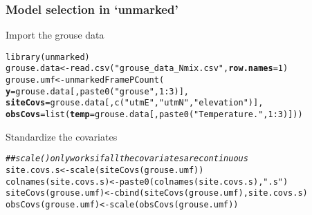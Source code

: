 \documentclass[color=usenames,dvipsnames]{beamer}\usepackage[]{graphicx}\usepackage[]{xcolor}
\makeatletter
\newcommand{\hlnum}[1]{\textcolor[rgb]{0.69,0.494,0}{#1}}%
\newcommand{\hlstr}[1]{\textcolor[rgb]{0.749,0.012,0.012}{#1}}%
\newcommand{\hlcom}[1]{\textcolor[rgb]{0.514,0.506,0.514}{\textit{#1}}}%
\newcommand{\hlopt}[1]{\textcolor[rgb]{0,0,0}{#1}}%
\newcommand{\hlstd}[1]{\textcolor[rgb]{0,0,0}{#1}}%
\newcommand{\hlkwb}[1]{\textcolor[rgb]{0,0.341,0.682}{#1}}%
\newcommand{\hlkwc}[1]{\textcolor[rgb]{0,0,0}{\textbf{#1}}}%
\newcommand{\hlkwd}[1]{\textcolor[rgb]{0.004,0.004,0.506}{#1}}%
\newenvironment{kframe}{%
 \def\at@end@of@kframe{}%
 \ifinner\ifhmode%
  \def\at@end@of@kframe{\end{minipage}}%
  \begin{minipage}{\columnwidth}%
 \fi\fi%
 \def\FrameCommand##1{\hskip\@totalleftmargin \hskip-\fboxsep
 \colorbox{shadecolor}{##1}\hskip-\fboxsep
     \hskip-\linewidth \hskip-\@totalleftmargin \hskip\columnwidth}%
 \MakeFramed {\advance\hsize-\width
   \@totalleftmargin\z@ \linewidth\hsize
   \@setminipage}}%
 {\par\unskip\endMakeFramed%
 \at@end@of@kframe}
\newenvironment{knitrout}{}{} %
\newcommand{\inr}[1]{\colorbox{inlinecolor}{\texttt{#1}}}
\makeatother
\begin{document}
\begin{frame}[fragile]
  \frametitle{Model selection in `unmarked'}
  \small
  Import the grouse data
  \vspace{-6pt}
\begin{knitrout}\footnotesize
{}\color{fgcolor}\begin{kframe}
\begin{alltt}
\hlkwd{library}\hlstd{(unmarked)}
\hlstd{grouse.data} \hlkwb{<-} \hlkwd{read.csv}\hlstd{(}\hlstr{"grouse_data_Nmix.csv"}\hlstd{,} \hlkwc{row.names}\hlstd{=}\hlnum{1}\hlstd{)}
\hlstd{grouse.umf} \hlkwb{<-} \hlkwd{unmarkedFramePCount}\hlstd{(}
    \hlkwc{y}\hlstd{=grouse.data[,}\hlkwd{paste0}\hlstd{(}\hlstr{"grouse"}\hlstd{,}\hlnum{1}\hlopt{:}\hlnum{3}\hlstd{)],}
    \hlkwc{siteCovs}\hlstd{=grouse.data[,}\hlkwd{c}\hlstd{(}\hlstr{"utmE"}\hlstd{,}\hlstr{"utmN"}\hlstd{,}\hlstr{"elevation"}\hlstd{)],}
    \hlkwc{obsCovs}\hlstd{=}\hlkwd{list}\hlstd{(}\hlkwc{temp}\hlstd{=grouse.data[,}\hlkwd{paste0}\hlstd{(}\hlstr{"Temperature."}\hlstd{,}\hlnum{1}\hlopt{:}\hlnum{3}\hlstd{)]))}
\end{alltt}
\end{kframe}
\end{knitrout}
\pause
\vfill
Standardize the covariates
  \vspace{-6pt}
\begin{knitrout}\footnotesize
{}\color{fgcolor}\begin{kframe}
\begin{alltt}
\hlcom{## scale() only works if all the covariates are continuous  }
\hlstd{site.covs.s} \hlkwb{<-} \hlkwd{scale}\hlstd{(}\hlkwd{siteCovs}\hlstd{(grouse.umf))}
\hlkwd{colnames}\hlstd{(site.covs.s)} \hlkwb{<-} \hlkwd{paste0}\hlstd{(}\hlkwd{colnames}\hlstd{(site.covs.s),} \hlstr{".s"}\hlstd{)}
\hlkwd{siteCovs}\hlstd{(grouse.umf)} \hlkwb{<-} \hlkwd{cbind}\hlstd{(}\hlkwd{siteCovs}\hlstd{(grouse.umf), site.covs.s)}
\hlkwd{obsCovs}\hlstd{(grouse.umf)} \hlkwb{<-} \hlkwd{scale}\hlstd{(}\hlkwd{obsCovs}\hlstd{(grouse.umf))}
\end{alltt}
\end{kframe}
\end{knitrout}
\end{frame}
\end{document}
